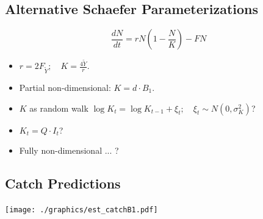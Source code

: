 \documentclass[letterpaper,KOMA,landscape,titlepage]{powersem}
\newcommand\MSY{\widetilde{Y}}
\begin{document}
\begin{slide}\section{Alternative Schaefer Parameterizations}
\begin{center}
$$\frac{dN}{dt} = rN(1-\frac{N}{K}) - FN$$
\end{center}
\begin{itemize}
\item $r=2F_{\MSY};\quad K=\frac{4\MSY}{r}$.
\item Partial non-dimensional: $K=d\cdot B_1$.
\item $K$ as random walk $\log K_t = \log K_{t-1} + \xi_t;\quad \xi_t\sim
N(0,\sigma^2_K)$?
\item $K_t = Q\cdot I_t$?
\item Fully non-dimensional ... ?
\end{itemize}
\end{slide}

\begin{slide}\section{Catch Predictions}
\begin{center}
\texttt{[image: ./graphics/est\_catchB1.pdf]}
\end{center}
\end{slide}
\end{document}
